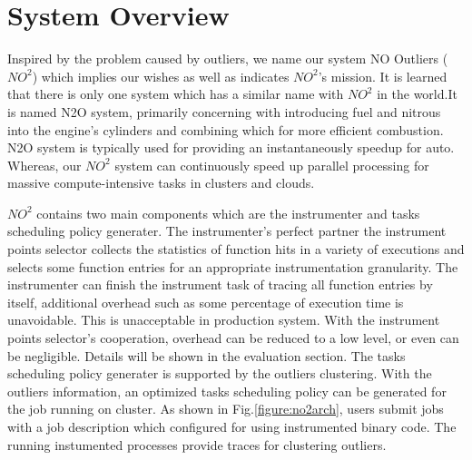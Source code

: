 \section{System Overview} \label{sec-overview}

Inspired by the problem caused by outliers, we name our system NO Outliers ($NO^2$) which implies our
wishes as well as indicates $NO^2$'s mission. It is learned that there is only one system which has a
similar name with $NO^2$ in the world.It is named N2O system, primarily concerning with
introducing fuel and nitrous into the engine's cylinders and combining which for more
efficient combustion. N2O system is typically used for providing an instantaneously speedup for auto.
Whereas, our $NO^2$ system can continuously speed up parallel processing for massive
compute-intensive tasks in clusters and clouds.

$NO^2$ contains two main components which are the instrumenter and tasks scheduling policy
generater. The instrumenter's perfect partner the instrument points selector
collects the statistics of function hits in a variety of executions and selects some
function entries for an appropriate instrumentation granularity. The instrumenter
can finish the instrument task of tracing all function entries by itself, additional overhead such
as some percentage of execution time is unavoidable. This is unacceptable in
production system. With the instrument points selector's cooperation, overhead can be
reduced to a low level, or even can be negligible. Details will be shown in the evaluation section. The
tasks scheduling policy generater is supported by the outliers clustering. With the
outliers information, an optimized tasks scheduling policy can be generated for the job
running on cluster. As shown in Fig.\ref{figure:no2arch}, users submit jobs with a job description which
configured for using instrumented binary code. The running instumented processes provide traces for
clustering outliers.


